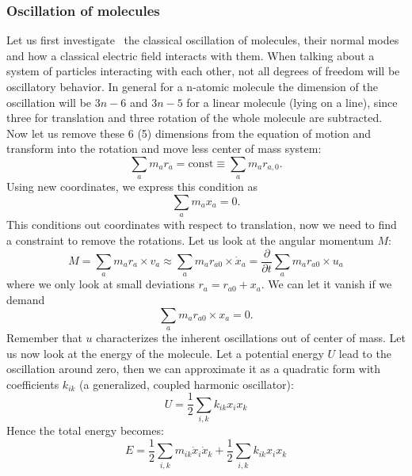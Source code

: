 \subsubsection{Oscillation of molecules}
\label{ssub:Oscillation_of_molecules}
Let us first investigate~\cite{landau1997mechanik} the classical oscillation of molecules, their normal modes and how a classical 
electric field interacts with them. When talking about a system of particles interacting with each other, not all degrees
of freedom will be oscillatory behavior. In general for a n-atomic molecule 
the dimension of the oscillation will be $3n - 6$ and $3n -5$ for a linear molecule (lying on a line), since three for
translation and three rotation of the whole molecule are subtracted. Now let us remove these 6 (5) dimensions from the
equation of motion and transform into the rotation and move less center of mass system:
\begin{equation}
    \sum_a m_a r_a = \mathrm{const} \equiv \sum_a m_a r_{a,0}.
\end{equation}
Using new coordinates, we express this condition as
\begin{equation}
    \sum_a m_a x_a = 0.
\end{equation}
This conditions out coordinates with respect to translation, now we need to find a constraint
to remove the rotations. Let us look at the angular momentum $M$: 
\begin{equation}
    M = \sum_a m_a r_a \times v_a \approx \sum_a m_a r_{a 0} \times \dot{x}_a = \frac{\partial}{\partial t}
    \sum_a m_a r_{a 0} \times u_a
\end{equation}
where we only look at small deviations $r_a = r_{a0} + x_a$. We can let it vanish if we demand
\begin{equation}
    \sum_a m_a r_{a0} \times x_a = 0.
\end{equation}
Remember that $u$ characterizes the inherent oscillations out of center of mass. Let us now
look at the energy of the molecule. Let a potential energy $U$ lead to the oscillation around zero,
then we can approximate it as a quadratic form with coefficients $k_{ik}$ (a generalized, coupled
harmonic oscillator):
\begin{equation}
    U = \frac{1}{2} \sum_{i,k} k_{ik} x_i x_k
\end{equation}
Hence the total energy becomes:
\begin{equation}
    E = \frac{1}{2} \sum_{i,k} m_{ik} \dot{x}_i\dot{x}_k + \frac{1}{2} \sum_{i,k} k_{ik} x_i x_k   
\end{equation}
